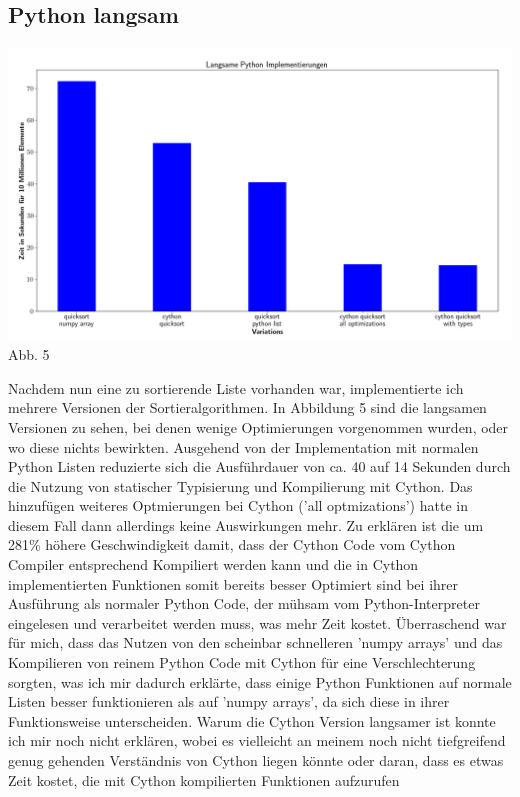 \documentclass[12pt,a4paper]{article}
\begin{document}
\subsection{Python langsam}

\begin{center}
    \hspace*{-1.5cm}\includegraphics[width=1.2\textwidth]{./diagramme/matplotlib/pythonlangsam.png}
    Abb. 5
\end{center}

Nachdem nun eine zu sortierende Liste vorhanden war, implementierte ich mehrere Versionen der Sortieralgorithmen.
In Abbildung 5 sind die langsamen Versionen zu sehen, bei denen wenige Optimierungen vorgenommen wurden, oder wo diese nichts bewirkten.
Ausgehend von der Implementation mit normalen Python Listen reduzierte sich die Ausführdauer von ca. 40 auf 14 Sekunden
durch die Nutzung von statischer Typisierung und Kompilierung mit Cython. Das hinzufügen weiteres Optmierungen
bei Cython ('all optmizations') hatte in diesem Fall dann allerdings keine Auswirkungen mehr.
Zu erklären ist die um 281\% höhere Geschwindigkeit damit, dass der Cython Code vom Cython Compiler
entsprechend Kompiliert werden kann und die in Cython implementierten Funktionen somit bereits besser
Optimiert sind bei ihrer Ausführung als normaler Python Code, der mühsam vom Python-Interpreter eingelesen
und verarbeitet werden muss, was mehr Zeit kostet.
Überraschend war für mich, dass das Nutzen von den scheinbar schnelleren 'numpy arrays' und das Kompilieren
von reinem Python Code mit Cython für eine Verschlechterung sorgten, was ich mir dadurch erklärte, dass einige
Python Funktionen auf normale Listen besser funktionieren als auf 'numpy arrays', da sich diese in ihrer Funktionsweise
unterscheiden. Warum die Cython Version langsamer ist konnte ich mir noch nicht erklären, wobei es vielleicht an meinem
noch nicht tiefgreifend genug gehenden Verständnis von Cython liegen könnte oder daran, dass es etwas Zeit kostet,
die mit Cython kompilierten Funktionen aufzurufen
\end{document}
